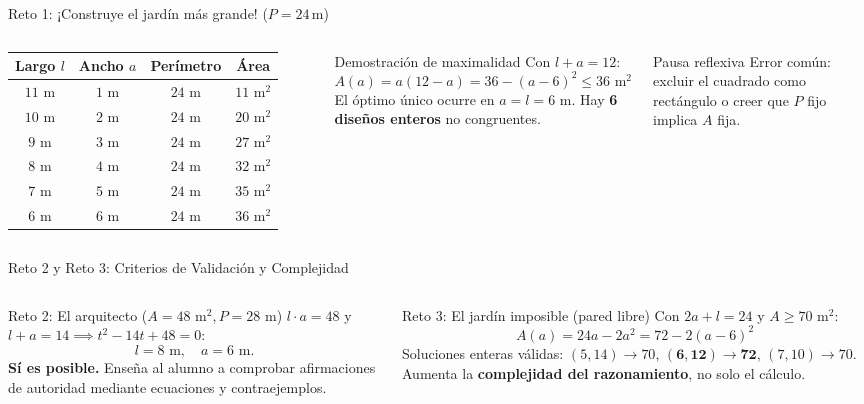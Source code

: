 \documentclass[spanish,aspectratio=1610,xcolor={dvipsnames,table}]{beamer}
\begin{document}
\begin{frame}{Reto 1: ¡Construye el jardín más grande! ($P = 24\,\text{m}$)}
  \begin{columns}[T]
      \small
      \begin{tabular}{cccc}
        \toprule
        \textbf{Largo $l$} & \textbf{Ancho $a$} & \textbf{Perímetro} & \textbf{Área} \\
        \midrule
        $11\text{ m}$ & $1\text{ m}$ & $24\text{ m}$ & $11\text{ m}^2$ \\
        $10\text{ m}$ & $2\text{ m}$ & $24\text{ m}$ & $20\text{ m}^2$ \\
        $9\text{ m}$  & $3\text{ m}$ & $24\text{ m}$ & $27\text{ m}^2$ \\
        $8\text{ m}$  & $4\text{ m}$ & $24\text{ m}$ & $32\text{ m}^2$ \\
        $7\text{ m}$  & $5\text{ m}$ & $24\text{ m}$ & $35\text{ m}^2$ \\
        \textbf{$6\text{ m}$} & \textbf{$6\text{ m}$} & $24\text{ m}$ & \textbf{$36\text{ m}^2$} \\
        \bottomrule
      \end{tabular}
      \begin{block}{Demostración de maximalidad}
        Con $l + a = 12$:
        \[
          A(a) = a(12-a) = 36 - (a-6)^2 \le 36\text{ m}^2
        \]
        El óptimo único ocurre en $a = l = 6\text{ m}$. Hay \textbf{6 diseños enteros} no congruentes.
      \end{block}
      \begin{alertblock}{Pausa reflexiva}
        Error común: excluir el cuadrado como rectángulo o creer que $P$ fijo implica $A$ fija.
      \end{alertblock}
  \end{columns}
\end{frame}

\begin{frame}{Reto 2 y Reto 3: Criterios de Validación y Complejidad}
  \begin{columns}[T]
      \begin{block}{Reto 2: El arquitecto ($A=48\text{ m}^2, P=28\text{ m}$)}
        $l\cdot a = 48$ y $l+a = 14 \implies t^2-14t+48=0$:
        \[
          l = 8\text{ m},\quad a = 6\text{ m}.
        \]
        \textbf{Sí es posible.} Enseña al alumno a comprobar afirmaciones de autoridad mediante ecuaciones y contraejemplos.
      \end{block}
      \begin{block}{Reto 3: El jardín imposible (pared libre)}
        Con $2a+l=24$ y $A\ge 70\text{ m}^2$:
        \[
          A(a) = 24a - 2a^2 = 72 - 2(a-6)^2
        \]
        Soluciones enteras válidas: $(5,14)\to 70$, $\mathbf{(6,12)\to 72}$, $(7,10)\to 70$. Aumenta la \textbf{complejidad del razonamiento}, no solo el cálculo.
      \end{block}
  \end{columns}
\end{frame}
\end{document}
